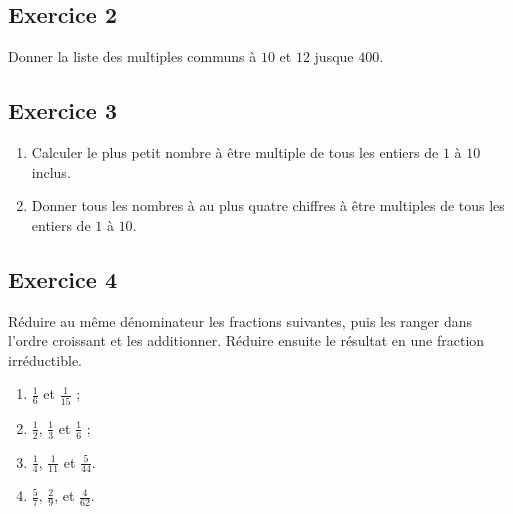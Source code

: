 \documentclass[12 pt]{article}
\theoremstyle{plain}
\newcounter{n}
\numberwithin{n}{section}
\begin{document}
\subsection*{Exercice 2}

Donner la liste des multiples communs à $10$ et $12$ jusque $400$. 

\subsection*{Exercice 3}

\begin{enumerate}
\item Calculer le plus petit nombre à être multiple de tous les entiers de $1$ à $10$ inclus. 
\item Donner tous les nombres à au plus quatre chiffres à être multiples de tous les entiers de $1$ à $10$. 
\end{enumerate}

\subsection*{Exercice 4}

Réduire au même dénominateur les fractions suivantes, puis les ranger dans l'ordre croissant et les additionner. Réduire ensuite le résultat en une fraction irréductible.
\begin{enumerate}
\item $\frac16$ et $\frac1{15}$ ;
\item $\frac12$, $\frac13$ et $\frac16$ ;
\item $\frac14$, $\frac1{11}$ et $\frac5{44}$. 
\item $\frac57$, $\frac29$, et $\frac4{62}$. 
\end{enumerate}

	
\end{document}
